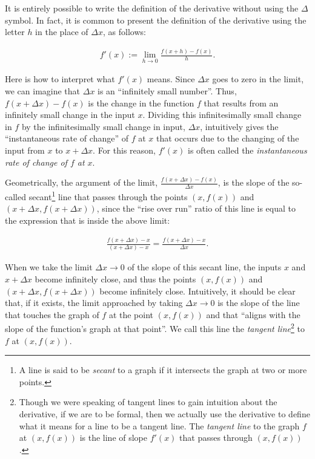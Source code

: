 \documentclass{article}
\begin{document}
It is entirely possible to write the definition of the derivative without using the $\Delta$ symbol. In fact, it is common to present the definition of the derivative using the letter $h$ in the place of $\Delta x$, as follows:

\begin{align*}
    f'(x) := \lim_{h \rightarrow 0} \frac{f(x + h) - f(x)}{h}.
\end{align*}

Here is how to interpret what $f'(x)$ means. Since $\Delta x$ goes to zero in the limit, we can imagine that $\Delta x$ is an ``infinitely small number''. Thus, $f(x + \Delta x) - f(x)$ is the change in the function $f$ that results from an infinitely small change in the input $x$. Dividing this infinitesimally small change in $f$ by the infinitesimally small change in input, $\Delta x$, intuitively gives the ``instantaneous rate of change'' of $f$ at $x$ that occurs due to the changing of the input from $x$ to $x + \Delta x$. For this reason, $f'(x)$ is often called the \textit{instantaneous rate of change of $f$ at $x$}.

Geometrically, the argument of the limit, $\frac{f(x + \Delta x) - f(x)}{\Delta x}$, is the slope of the so-called secant\footnote{A line is said to be \textit{secant} to a graph if it intersects the graph at two or more points.} line that passes through the points $(x, f(x))$ and $(x + \Delta x, f(x + \Delta x))$, since the ``rise over run'' ratio of this line is equal to the expression that is inside the above limit:

\begin{align*}
    \frac{f(x + \Delta x) - x}{(x + \Delta x) - x} = \frac{f(x + \Delta x) - x}{\Delta x}.
\end{align*}

When we take the limit $\Delta x \rightarrow 0$ of the slope of this secant line, the inputs $x$ and $x + \Delta x$ become infinitely close, and thus the points $(x, f(x))$ and $(x + \Delta x, f(x + \Delta x))$ become infinitely close. Intuitively, it should be clear that, if it exists, the limit approached by taking $\Delta x \rightarrow 0$ is the slope of the line that touches the graph of $f$ at the point $(x, f(x))$ and that ``aligns with the slope of the function's graph at that point''. We call this line the \textit{tangent line}\footnote{Though we were speaking of tangent lines to gain intuition about the derivative, if we are to be formal, then we actually use the derivative to define what it means for a line to be a tangent line. The \textit{tangent line} to the graph $f$ at $(x, f(x))$ is the line of slope $f'(x)$ that passes through $(x, f(x))$.} to $f$ at $(x, f(x))$.
\end{document}
